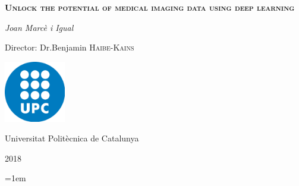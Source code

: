 \documentclass[a4paper, 12pt]{article}
\begin{document}
\begin{titlepage}
    \centering
    \vspace{1.5cm}
    {\huge \textbf{\textsc{Unlock the potential of medical imaging data using deep learning}} \par}
    \vspace{2cm}
    {\Large \textit{Joan Marcè i Igual}\par}
    \vfill
    Director: Dr.Benjamin \textsc{Haibe-Kains}
    
    \vfill

    \includegraphics[width=0.2\textwidth]{images/logo_upc}\par\vspace{1cm}
    \vfill
    
    {\LARGE Universitat Politècnica de Catalunya \par}
    {\LARGE 2018 \par}
\end{titlepage}

\tableofcontents

\pagebreak

% 



\pagebreak
\emergencystretch=1em
\printbibliography{}
\end{document}
